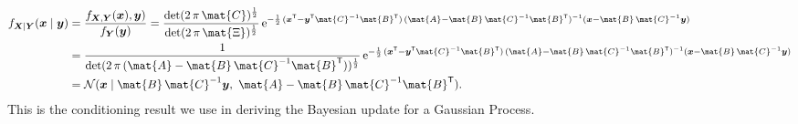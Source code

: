 \documentclass{sotonExamBoxes}    %
\newcommand{\tr}{\textsf{T}}
\newcommand{\e}[1]{{\rm e}^{#1}}
\renewcommand{\det}[1]{\textrm{det}({#1})}
\begin{document}
\begin{question}{25}
\begin{qparts}
\begin{answer}
         \end{answer}
         \clearpage
       \begin{answer}
         \begin{align*}
           f_{\bm{X}|\bm{Y}}(\bm{x}\mid\bm{y}) &= \frac{f_{\bm{X},\bm{Y}}(\bm{x}),
           \bm{y})}{f_{\bm{Y}}(\bm{y})}
           =
           \frac{\det{2\,\pi\,\mat{C}}^{\frac{1}{2}}}{\det{2\,\pi\,\mat{\Xi}}^{\frac{1}{2}}}
           \,\e{- \frac{1}{2}\,
           (\bm{x}^{\tr}-\bm{y}^{\tr}\mat{C}^{-1}\mat{B}^{\tr})\,(\mat{A}-
           \mat{B}\,\mat{C}^{-1}\mat{B}^\tr)^{-1}(\bm{x}-\mat{B}\,\mat{C}^{-1}\bm{y})}\\ 
           &= \frac{1}{\det{2\,\pi\,(\mat{A}- \mat{B}\,\mat{C}^{-1}\mat{B}^\tr)}^{\frac{1}{2}}}
             \,\e{- \frac{1}{2}\,
             (\bm{x}^{\tr}-\bm{y}^{\tr}\mat{C}^{-1}\mat{B}^{\tr})\,(\mat{A}-
             \mat{B}\,\mat{C}^{-1}\mat{B}^\tr)^{-1}(\bm{x}-\mat{B}\,\mat{C}^{-1}\bm{y})}\\  
           &= \mathcal{N}(\bm{x} \mid \mat{B}\,\mat{C}^{-1}\bm{y},\,\, \mat{A}-  \mat{B}\,\mat{C}^{-1}\mat{B}^\tr). 
         \end{align*}
         This is the conditioning result we use in deriving the
         Bayesian update for a Gaussian Process.
       \end{answer}
    \end{qparts}
\end{question}
\end{document}
